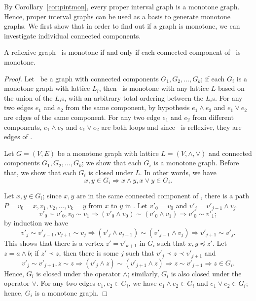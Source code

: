 By Corollary~\ref{cor:pintmon}, every proper interval graph is a monotone graph.
Hence, proper interval graphs can be used as a basis to generate monotone graphs.
We first show that in order to find out if a graph is monotone, we can 
investigate individual connected components.

\begin{lemma} \label{lem:monotone:con}
A reflexive graph \mG\ is monotone if and only if each connected component of \mG\ is monotone.
\end{lemma}

\begin{proof}
Let \mG\  be a graph with connected components \(G_1,G_2,\dotsc,G_k\);
if each \(G_i\) is a monotone graph with lattice \(L_i\),
then \mG\ is monotone with any lattice \(L\) based on the union of the \(L_i\)s, with
an arbitrary total ordering between the \(L_i\)s\@.
For any two edges \(e_1\) and \(e_2\) from the same component,
by hypothesis \(e_1\wedge e_2\) and \(e_1\vee e_2\) are
edges of the same component.
For any two edge \(e_1\) and \(e_2\) from different components,
\(e_1\wedge e_2\) and \(e_1\vee e_2\) are both loops and since \mG\ is reflexive,
they are edges of \mG\@.

Let \(G=(V,E)\) be a monotone graph with lattice \(L=(V,\wedge,\vee)\) and connected components \(G_1,G_2,\dotsc,G_k\);
we show that each \(G_i\) is a monotone graph. Before that, we show that each \(G_i\) is closed under \(L\)\@.
In other words, we have \[x,y\in G_i \Rightarrow x\wedge y, x\vee y \in G_i.\]

Let \(x, y\in G_i\);
since \(x,y\) are in the same connected component of \mG, there is a path \(P=v_0=x,v_1,v_2,\dotsc,v_k=y\)
from \(x\) to \(y\) in \mG\@. Let \(v'_0 = v_0\) and \(v'_j = v'_{j-1} \wedge v_j\)\@.
\[v'_0 \sim v'_0, v_0\sim v_1 \Rightarrow (v'_0 \wedge v_0) \sim (v'_0 \wedge v_1) \Rightarrow v'_0 \sim v'_1;\]
by induction we have
\[v'_j \sim v'_{j-1}, v_{j+1} \sim v_j \Rightarrow (v'_j \wedge v_{j+1}) \sim (v'_{j-1} \wedge v_j) \Rightarrow v'_{j+1} \sim v'_j.\]
This shows that there is a vertex \(z'=v'_{k+1}\) in \(G_i\) such that \(x,y\preceq z'\)\@.
Let \(z = a\wedge b\); if \(z' \prec z\), then there is some \(j\) such that \(v'_j \prec z \prec v'_{j+1}\) and 
\[v'_j\sim v'_{j+1}, z \sim z \Rightarrow (v'_j \wedge z) \sim (v'_{j+1} \wedge z) \Rightarrow z \sim v'_{j+1} \Rightarrow z \in G_i.\]
Hence, \(G_i\) is closed under the operator \(\wedge\); similarly, \(G_i\) is also closed under the operator \(\vee\).
For any two edges \(e_1,e_2\in G_i\), we have \(e_1\wedge e_2\in G_i\) and \(e_1\vee e_2 \in G_i\); hence, \(G_i\) is a monotone graph.
\end{proof}

